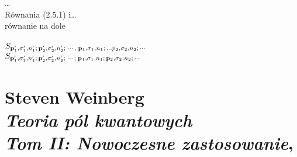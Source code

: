 \documentclass[a4paper,11pt]{article}
\numberwithin{equation}{section}
\begin{document}
\VerSpaceTwo


\noindent
{} \ldots \\
 Równania (2.5.1) i\ldots \\
 równanie na dole \\
 \\
\Jest $S_{ \mathbf{p}_{ 1 }', \sigma_{ 1 }', n_{ 1 }'; \, \mathbf{p}_{ 2 }',
  \sigma_{ 2 }', n_{ 2 }';\; \cdots, \; \mathbf{p}_{ 1 }, \sigma_{ 1 },
  n_{ 1 } ; \, \ldots { p }_{ 2 }, \sigma_{ 2 }, n_{ 2 }; \, \cdots }$ \\[0.5em]
\PowinnoByc $S_{ \mathbf{p}_{ 1 }', \sigma_{ 1 }', n_{ 1 }'; \, \mathbf{p}_{ 2 }',
  \sigma_{ 2 }', n_{ 2 }';\; \cdots; \; \mathbf{p}_{ 1 }, \sigma_{ 1 },
  n_{ 1 } ; \, \mathbf{p}_{ 2 }, \sigma_{ 2 }, n_{ 2 }; \, \cdots }$ \\















\newpage

\section{ %
  Steven Weinberg \\
  \textit{Teoria pól kwantowych} \\
  \textit{Tom II: Nowoczesne zastosowanie},
  \cite{WeinbergTeoriaPolKwantowychNowoczesneZastosowania1999}}







\end{document}
